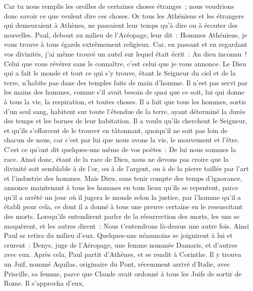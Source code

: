 \begin{multicols}{2}
Car tu nous remplis les oreilles de certaines choses étranges~; nous voudrions donc savoir ce que veulent dire ces choses.
Or tous les Athéniens et les étrangers qui demeuraient à Athènes, ne passaient leur temps qu'à dire ou à écouter des nouvelles.
Paul, debout au milieu de l'Aréopage, leur dit~: Hommes Athéniens, je vous trouve à tous égards extrêmement religieux.
Car, en passant et en regardant vos divinités, j'ai même trouvé un autel sur lequel était écrit~: Au dieu inconnu~! Celui que vous révérez sans le connaître, c'est celui que je vous annonce.
Le Dieu qui a fait le monde et tout ce qui s'y trouve, étant le Seigneur du ciel et de la terre, n'habite pas dans des temples faits de main d'homme.
Il n'est pas servi par les mains des hommes, comme s'il avait besoin de quoi que ce soit, lui qui donne à tous la vie, la respiration, et toutes choses.
Il a fait que tous les hommes, sortis d'un seul sang, habitent sur toute l'étendue de la terre, ayant déterminé la durée des temps et les bornes de leur habitation.
Il a voulu qu'ils cherchent le Seigneur, et qu'ils s'efforcent de le trouver en tâtonnant, quoiqu'il ne soit pas loin de chacun de nous,
car c'est par lui que nous avons la vie, le mouvement et l'être. C'est ce qu'ont dit quelques-uns même de vos poètes~: De lui nous sommes la race.
Ainsi donc, étant de la race de Dieu, nous ne devons pas croire que la divinité soit semblable à de l'or, ou à de l'argent, ou à de la pierre taillée par l'art et l'industrie des hommes.
Mais Dieu, sans tenir compte des temps d'ignorance, annonce maintenant à tous les hommes en tous lieux qu'ils se repentent,
parce qu'il a arrêté un jour où il jugera le monde selon la justice, par l'homme qu'il a établi pour cela, ce dont il a donné à tous une preuve certaine en le ressuscitant des morts.
Lorsqu'ils entendirent parler de la résurrection des morts, les uns se moquèrent, et les autres dirent~: Nous t'entendrons là-dessus une autre fois.
Ainsi Paul se retira du milieu d'eux.
Quelques-uns néanmoins se joignirent à lui et crurent~: Denys, juge de l'Aéropage, une femme nommée Damaris, et d'autres avec eux.
\VerseOne{}Après cela, Paul partit d'Athènes, et se rendit à Corinthe.
Il y trouva un Juif, nommé Aquilas, originaire du Pont, récemment arrivé d'Italie, avec Priscille, sa femme, parce que Claude avait ordonné à tous les Juifs de sortir de Rome. Il s'approcha d'eux,

\end{multicols}
